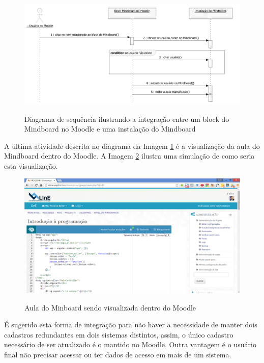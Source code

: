 \begin{figure}
\centering
\caption{Diagrama de sequência ilustrando a integração entre um block do Mindboard no Moodle e uma instalação do Mindboard}
\includegraphics[width=1.0\textwidth]{pdfs/img-sequencia-integracao.pdf} 
\label{fig:sequencia_integracao} 
\end{figure}

A última atividade descrita no diagrama da Imagem \ref{fig:sequencia_integracao} é a visualização da aula do Mindboard dentro do Moodle. A Imagem \ref{fig:visualizacao_moodle} ilustra uma simulação de como seria esta visualização.

\begin{figure}
\centering
\caption{Aula do Minboard sendo visualizada dentro do Moodle}
\includegraphics[width=1.0\textwidth]{imgs/tela_mindboard_moodle.png} 
\label{fig:visualizacao_moodle} 
\end{figure}

É sugerido esta forma de integração para não haver a necessidade de manter dois cadastros redundantes em dois sistemas distintos, assim, o único cadastro necessário de ser atualizado é o mantido no Moodle. Outra vantagem é o usuário final não precisar acessar ou ter dados de acesso em mais de um sistema.

